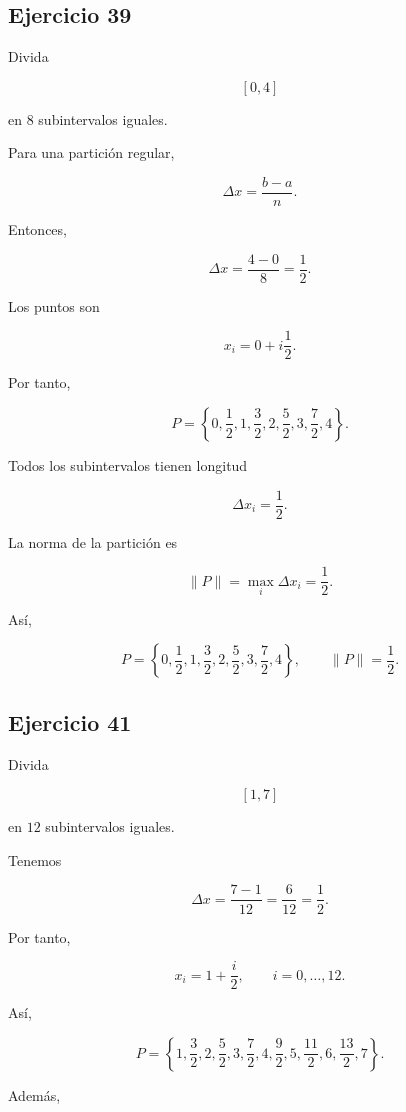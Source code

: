\documentclass[12pt]{article}
\begin{document}
\subsection*{Ejercicio 39}

Divida

\[
[0,4]
\]

en \(8\) subintervalos iguales.

Para una partición regular,

\[
\Delta x=
\frac{b-a}{n}.
\]

Entonces,

\[
\Delta x
=
\frac{4-0}{8}
=
\frac12.
\]

Los puntos son

\[
x_i=0+i\frac12.
\]

Por tanto,

\[
P=
\left\{
0,\frac12,1,\frac32,2,\frac52,3,\frac72,4
\right\}.
\]

Todos los subintervalos tienen longitud

\[
\Delta x_i=\frac12.
\]

La norma de la partición es

\[
\|P\|
=
\max_i\Delta x_i
=
\frac12.
\]

Así,

\[
\boxed{
P=
\left\{
0,\frac12,1,\frac32,2,\frac52,3,\frac72,4
\right\},
\qquad
\|P\|=\frac12
}.
\]

\subsection*{Ejercicio 41}

Divida

\[
[1,7]
\]

en \(12\) subintervalos iguales.

Tenemos

\[
\Delta x
=
\frac{7-1}{12}
=
\frac6{12}
=
\frac12.
\]

Por tanto,

\[
x_i
=
1+\frac{i}{2},
\qquad
i=0,\ldots,12.
\]

Así,

\[
P=
\left\{
1,\frac32,2,\frac52,3,\frac72,4,
\frac92,5,\frac{11}{2},6,\frac{13}{2},7
\right\}.
\]

Además,
\end{document}
